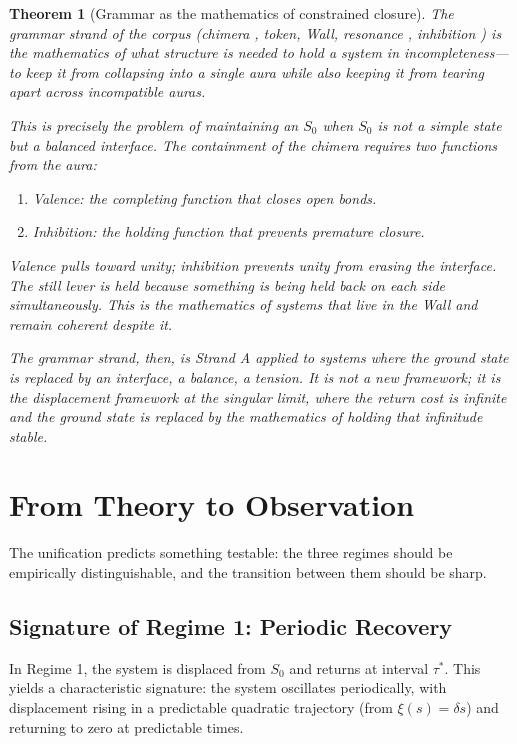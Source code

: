 \documentclass[12pt]{article}
\newtheorem{theorem}{Theorem}
\theoremstyle{definition}
\theoremstyle{remark}
\begin{document}
\begin{theorem}[Grammar as the mathematics of constrained closure]
The grammar strand of the corpus (chimera \cite{chimera}, token, Wall, resonance \cite{resonance}, inhibition \cite{inhibition}) is the mathematics of what structure is needed to hold a system in incompleteness---to keep it from collapsing into a single aura while also keeping it from tearing apart across incompatible auras.

This is precisely the problem of maintaining an $S_0$ when $S_0$ is not a simple state but a balanced interface. The containment of the chimera requires two functions from the aura:
\begin{enumerate}
\item Valence: the completing function that closes open bonds.
\item Inhibition: the holding function that prevents premature closure.
\end{enumerate}

Valence pulls toward unity; inhibition prevents unity from erasing the interface. The still lever is held because something is being held back on each side simultaneously. This is the mathematics of systems that live in the Wall and remain coherent despite it.

The grammar strand, then, is Strand A applied to systems where the ground state is replaced by an interface, a balance, a tension. It is not a new framework; it is the displacement framework at the singular limit, where the return cost is infinite and the ground state is replaced by the mathematics of holding that infinitude stable.
\end{theorem}

\section{From Theory to Observation}

The unification predicts something testable: the three regimes should be empirically distinguishable, and the transition between them should be sharp.

\subsection{Signature of Regime 1: Periodic Recovery}

In Regime 1, the system is displaced from $S_0$ and returns at interval $\tau^*$. This yields a characteristic signature: the system oscillates periodically, with displacement rising in a predictable quadratic trajectory (from $\xi(s)=\delta s$) and returning to zero at predictable times.
\end{document}

